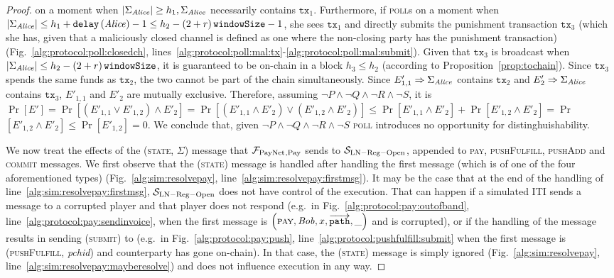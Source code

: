 \begin{proof}
  on a moment when $|\Sigma_{\mathit{Alice}}| \geq h_1, \Sigma_{\mathit{Alice}}$ necessarily
  contains $\mathtt{tx}_1$. Furthermore, if \alice{} \textsc{poll}s on a moment
  when $|\Sigma_{\mathit{Alice}}| \leq h_1 + \mathtt{delay}\left(\mathit{Alice}\right) - 1 \leq
  h_2 - \left(2 + r\right)\texttt{windowSize}{} - 1$, she sees $\mathtt{tx}_1$ and directly submits the
  punishment transaction $\mathtt{tx}_3$ (which she has, given that a
  maliciously closed channel is defined as one where the non-closing party has
  the punishment transaction) (Fig.~\ref{alg:protocol:poll:closedch},
  lines~\ref{alg:protocol:poll:mal:tx}-\ref{alg:protocol:poll:mal:submit}).
  Given that $\mathtt{tx}_3$ is broadcast when $|\Sigma_{\mathit{Alice}}| \leq h_2 -
  \left(2 + r\right)\texttt{windowSize}{}$, it is guaranteed to be on-chain in a block $h_3 \leq h_2$
  (according to Proposition~\ref{prop:tochain}). Since $\mathtt{tx}_3$ spends
  the same funds as $\mathtt{tx}_2$, the two cannot be part of the chain
  simultaneously. Since $E'_{1,1} \Rightarrow \Sigma_{\mathit{Alice}}$ contains
  $\mathtt{tx}_2$ and $E'_2 \Rightarrow \Sigma_{\mathit{Alice}}$ contains
  $\mathtt{tx}_3$, $E'_{1,1}$ and $E'_2$ are mutually exclusive. Therefore,
  assuming $\neg P \wedge \neg Q \wedge \neg R \wedge \neg S$, it is
  $\Pr\left[E'\right] = \Pr\left[\left(E'_{1,1} \vee E'_{1,2}\right) \wedge
  E'_2\right] = \Pr\left[\left(E'_{1,1} \wedge E'_2\right) \vee \left(E'_{1,2}
  \wedge E'_2\right)\right] \leq \Pr\left[E'_{1,1} \wedge E'_2\right] +
  \Pr\left[E'_{1,2} \wedge E'_2\right] = \Pr$ $\left[ E'_{1,2} \wedge
  E'_2\right] \leq \Pr\left[E'_{1,2}\right] = 0$. We conclude that, given $\neg
  P \wedge \neg Q \wedge \neg R \wedge \neg S$ \textsc{poll} introduces no
  opportunity for distinghuishability.

  We now treat the effects of the (\textsc{state}, $\Sigma$) message that
  $\mathcal{F}_{\mathrm{PayNet}}{}_{\mathrm{, Pay}}$ sends to $\mathcal{S}_{\mathrm{LN - Reg -
  Open}}$, appended to \textsc{pay}, \textsc{pushFulfill}, \textsc{pushAdd} and
  \textsc{commit} messages. We first observe that the (\textsc{state}) message
  is handled after handling the first message (which is of one of the four
  aforementioned types) (Fig.~\ref{alg:sim:resolvepay},
  line~\ref{alg:sim:resolvepay:firstmsg}). It may be the case that at the end of
  the handling of line~\ref{alg:sim:resolvepay:firstmsg},
  $\mathcal{S}_{\mathrm{LN - Reg - Open}}$ does not have control of the
  execution. That can happen if a simulated ITI sends a message to a corrupted
  player and that player does not respond (e.g.\ in
  Fig.~\ref{alg:protocol:pay:outofband},
  line~\ref{alg:protocol:pay:sendinvoice}, when the first message is
  $\left(\textsc{pay}, \mathit{Bob}, x, \overrightarrow{\mathtt{path}},
  \_\right)$ and \bob{} is corrupted), or if the handling of the
  message results in sending (\textsc{submit}) to \ledger{} (e.g.\ in
  Fig.~\ref{alg:protocol:pay:push}, line~\ref{alg:protocol:pushfulfill:submit}
  when the first message is (\textsc{pushFulfill}, \textit{pchid}) and
  counterparty has gone on-chain). In that case, the (\textsc{state}) message is
  simply ignored (Fig.~\ref{alg:sim:resolvepay},
  line~\ref{alg:sim:resolvepay:mayberesolve}) and does not influence execution
  in any way.


\end{proof}
